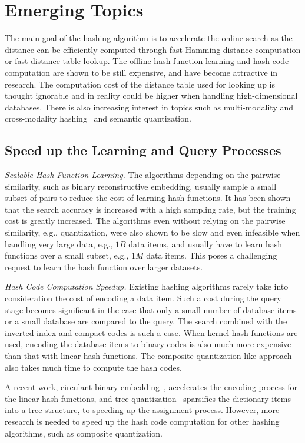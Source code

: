 \documentclass[10pt,journal,compsoc]{IEEEtran}
\begin{document}
\section{Emerging Topics}
\label{sec:trends}
The main goal of the hashing algorithm
is to accelerate the online search
as the distance can be efficiently computed
through fast Hamming distance computation
or fast distance table lookup.
The offline hash function learning
and hash code computation
are shown to be still expensive,
and have become attractive in research.
The computation cost of the distance table used for looking up
is thought ignorable
and in reality could be higher
when handling high-dimensional databases.
There is also increasing interest
in topics
such as multi-modality and cross-modality hashing~\cite{IrieAT15}
and semantic quantization.


\subsection{Speed up the Learning and Query Processes}
\emph{Scalable Hash Function Learning.}
The algorithms depending on the pairwise similarity,
such as binary reconstructive embedding,
usually sample a small subset of pairs
to reduce the cost of learning hash functions.
It has been shown that
the search accuracy is increased
with a high sampling rate,
but the training cost is greatly increased.
The algorithms even without relying on the pairwise similarity,
e.g., quantization,
were also shown to be slow and even infeasible
when handling very large data, e.g., $1B$ data items,
and usually have to learn hash functions over a small subset, e.g., $1M$ data items.
This poses a challenging request
to learn the hash function over larger datasets.

\emph{Hash Code Computation Speedup.}
Existing hashing algorithms rarely take
into consideration the cost of encoding a data item.
Such a cost during the query stage becomes significant
in the case
that only a small number of database items
or a small database
are compared to the query.
The search combined with the
inverted index and compact codes
is such a case.
When kernel hash functions are used,
encoding the database items to binary codes
is also much more expensive
than that with linear hash functions.
The composite quantization-like approach also takes
much time
to compute the hash codes.


A recent work, circulant binary embedding~\cite{YuKGC14},
accelerates the encoding process for the linear hash functions,
and tree-quantization~\cite{BabenkoK15}
sparsifies the dictionary items
into a tree structure,
to speeding up the assignment process.
However, more research is needed
to speed up the hash code computation for other hashing algorithms,
such as composite quantization.
\end{document}
